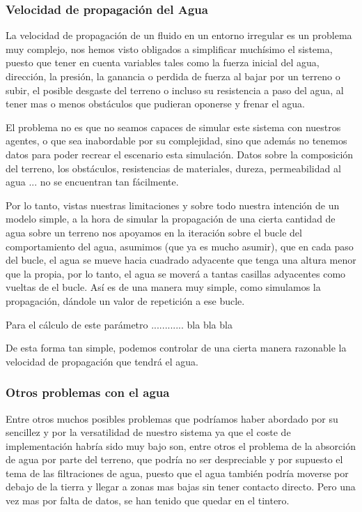 \subsubsection*{Velocidad de propagación del Agua}

La velocidad de propagación de un fluido en un entorno irregular es un problema
muy complejo, nos hemos visto 
obligados a simplificar muchísimo el sistema,
puesto que tener en cuenta
variables tales como la fuerza inicial del agua, dirección, la presión, la
ganancia o perdida de fuerza al bajar por un terreno o subir, el posible
desgaste del terreno o incluso su resistencia a paso del agua, al tener mas o
menos obstáculos que pudieran oponerse y frenar el agua. 

El problema no es que no seamos capaces de simular este sistema con nuestros
agentes, o que sea inabordable por su complejidad, sino que además no tenemos 
datos para poder recrear el escenario
esta simulación. Datos sobre la composición del terreno, los obstáculos,
resistencias de materiales, dureza, permeabilidad al agua ... no se encuentran
tan fácilmente.

Por lo tanto, vistas nuestras limitaciones y sobre todo nuestra intención de un
modelo simple, a la hora de simular la propagación de una cierta cantidad de
agua sobre un terreno nos apoyamos en la iteración sobre el bucle del
comportamiento del agua, asumimos (que ya es mucho asumir), que en cada paso del
bucle, el agua se mueve hacia cuadrado adyacente que tenga una altura menor que
la propia, por lo tanto, el agua se moverá a tantas casillas adyacentes como
vueltas de el bucle. Así es de una manera muy simple, como simulamos la
propagación, dándole un valor de repetición a ese bucle.

Para el cálculo de este parámetro ............ bla bla bla

De esta forma tan simple, podemos controlar de una cierta manera razonable la
velocidad de propagación que tendrá el agua.

\subsubsection*{Otros problemas con el agua}

Entre otros muchos posibles problemas que podríamos haber abordado por su
sencillez y por la versatilidad de nuestro sistema ya que el coste de
implementación habría sido muy bajo son, entre otros el problema de la absorción
de agua por parte del terreno, que podría no ser despreciable y por supuesto el
tema de las filtraciones de agua, puesto que el agua también podría moverse por
debajo de la tierra y llegar a zonas mas bajas sin tener contacto directo. Pero
una vez mas por falta de datos, se han tenido que quedar en el tintero.


